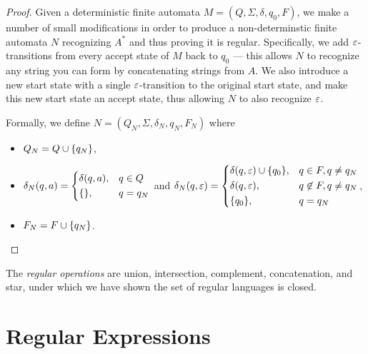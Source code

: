 \begin{proof}
    Given a deterministic finite automata $M = (Q, \Sigma, \delta, q_0, F)$, we make a number of small modifications in order to produce a non-determinstic finite automata $N$ recognizing $A^{*}$ and thus proving it is regular. Specifically, we add $\varepsilon$-transitions from every accept state of $M$ back to $q_0$ --- this allows $N$ to recognize any string you can form by concatenating strings from $A$. We also introduce a new start state with a single $\varepsilon$-transition to the original start state, and make this new start state an accept state, thus allowing $N$ to also recognize $\varepsilon$.

    Formally, we define $N = (Q_N, \Sigma, \delta_N, q_N, F_N)$ where
    \begin{itemize}
        \item $Q_N = Q \cup \{q_N\}$,
        \item $\delta_N(q, a) = \begin{dcases}
            \delta(q, a), &q \in Q \\
            \{\}, &q = q_N \\
        \end{dcases}$ and $\delta_N(q, \varepsilon) = \begin{dcases}
            \delta(q, \varepsilon) \cup \{q_0\}, &q \in F, q \neq q_N \\
            \delta(q, \varepsilon), &q \not\in F, q \neq q_N \\
            \{q_0\}, &q = q_N \\
        \end{dcases}$,
        \item $F_N = F \cup \{q_N\}$.
    \end{itemize}
\end{proof}

\begin{defn}
    The \emph{regular operations} are union, intersection, complement, concatenation, and star, under which we have shown the set of regular languages is closed.
\end{defn}

\section{Regular Expressions}

